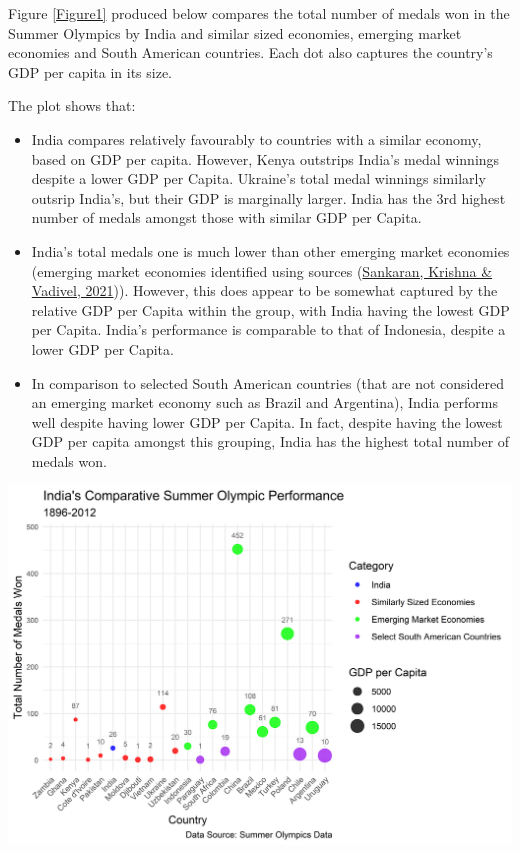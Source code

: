 \documentclass[11pt,preprint, authoryear]{elsarticle}
\let\origfigure\figure
\let\endorigfigure\endfigure
\renewenvironment{figure}[1][2] {
    \expandafter\origfigure\expandafter[H]
} {
    \endorigfigure
}
\numberwithin{equation}{section}
\numberwithin{figure}{section}
\numberwithin{table}{section}
\begin{document}
Figure \ref{Figure1} produced below compares the total number of medals
won in the Summer Olympics by India and similar sized economies,
emerging market economies and South American countries. Each dot also
captures the country's GDP per capita in its size.

The plot shows that:

\begin{itemize}
\item
  India compares relatively favourably to countries with a similar
  economy, based on GDP per capita. However, Kenya outstrips India's
  medal winnings despite a lower GDP per Capita. Ukraine's total medal
  winnings similarly outsrip India's, but their GDP is marginally
  larger. India has the 3rd highest number of medals amongst those with
  similar GDP per Capita.
\item
  India's total medals one is much lower than other emerging market
  economies (emerging market economies identified using sources
  (\protect\hyperlink{ref-sankaran2021does}{Sankaran, Krishna \&
  Vadivel, 2021})). However, this does appear to be somewhat captured by
  the relative GDP per Capita within the group, with India having the
  lowest GDP per Capita. India's performance is comparable to that of
  Indonesia, despite a lower GDP per Capita.
\item
  In comparison to selected South American countries (that are not
  considered an emerging market economy such as Brazil and Argentina),
  India performs well despite having lower GDP per Capita. In fact,
  despite having the lowest GDP per capita amongst this grouping, India
  has the highest total number of medals won.
\end{itemize}

\begin{figure}[H]

{\centering \includegraphics{Question_4_files/figure-latex/Figure1-1} 

}

\caption{India's Comparative Performance \label{Figure1}}\label{fig:Figure1}
\end{figure}
\end{document}
